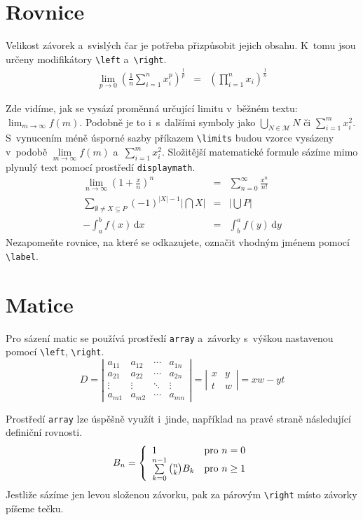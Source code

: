 \documentclass[11pt, twocolumn, a4paper]{article}
\theoremstyle{plain}
\theoremstyle{plain}
\begin{document}
\section{Rovnice}
Velikost závorek a~svislých čar je potřeba přizpůsobit jejich obsahu.
K~tomu jsou určeny modifikátory \verb|\left| a~\verb|\right|.
\begin{eqnarray}
    \lim\limits_{p \rightarrow 0} \left( \frac{1}{n} \sum\limits_{i=1}^n x_i^p \right)^{\frac{1}{p}}&=&\left( \prod\limits_{i=1}^{n} x_i \right)^{\frac{1}{n}}
\end{eqnarray}

Zde vidíme, jak se vysází proměnná určující limitu v~běžném textu: $\lim_{m \rightarrow \infty} f(m)$.
Podobně je to i~s~dalšími symboly jako $\bigcup_{N\in\mathcal{M}}N$ či $\sum^{m}_{i=1} x_{i}^{2}$.
S~vynucením méně úsporné sazby příkazem \verb|\limits| budou vzorce vysázeny v~podobě $\lim\limits_{m \rightarrow \infty} f(m)$ a~$ \sum\limits^{m}_{i=1} x_{i}^{2}$.
Složitější matematické formule sázíme mimo plynulý text pomocí prostředí \texttt{displaymath}.
\begin{eqnarray}
    \lim\limits_{n\rightarrow\infty}\left(1 + \frac{x}{n}\right)^{n} & = & \sum\limits_{n=0}^{\infty}\frac{x^n}{n!}\\
    \sum\limits_{\emptyset\neq X \subseteq P}(-1)^{\left| X \right| - 1}\left| \bigcap X\right| & = & \left| \bigcup P \right|\\
    -\int_{a}^{b} f(x)\,\mathrm{d}x & = & \int_{b}^{a} f(y)\,\mathrm{d}y \label{eq_7}
\end{eqnarray}
Nezapomeňte rovnice, na které se odkazujete, označit vhodným jménem pomocí \verb|\label|.

\section{Matice}
Pro sázení matic se používá prostředí \texttt{array} a~závorky s~výškou nastavenou pomocí
\verb|\left|, \verb|\right|.
$$
D = 
\left| \begin{array}{cccc}
    a_{11} & a_{12} & \cdots & a_{1n}\\
    a_{21} & a_{22} & \cdots & a_{2n}\\
    \vdots & \vdots & \ddots & \vdots\\
    a_{m1} & a_{m2} & \cdots & a_{mn}
        \end{array}\right|
= 
\left| \begin{array}{cc}
    x & y\\
    t & w
        \end{array}\right|
= xw - yt$$

Prostředí \texttt{array} lze úspěšně využít i~jinde,
například na pravé straně následující definiční rovnosti.
$$ B_n = \left\{
\begin{array}{l l}
1 & \text{pro } n = 0 \\
\sum\limits^{n-1}_{k=0}\binom{n}{k} B_k & \text{pro } n \geq 1
\end{array} \right. $$
Jestliže sázíme jen levou složenou závorku, pak za párovým \verb|\right|
místo závorky píšeme tečku.
\label{pg_one}
\end{document}
